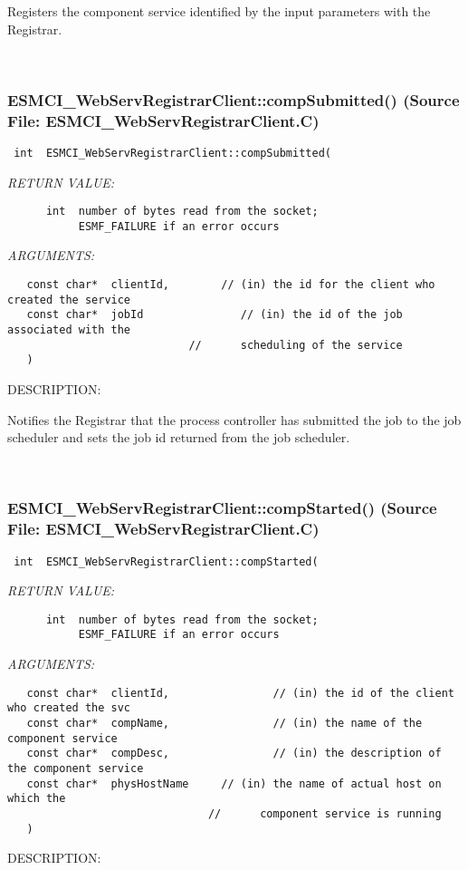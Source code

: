       Registers the component service identified by the input parameters
      with the Registrar.
   
 
\mbox{}\hrulefill\
 
\subsubsection{ESMCI\_WebServRegistrarClient::compSubmitted() (Source File: ESMCI\_WebServRegistrarClient.C)}


  
\begin{verbatim} int  ESMCI_WebServRegistrarClient::compSubmitted(\end{verbatim}{\em RETURN VALUE:}
\begin{verbatim}      int  number of bytes read from the socket;
           ESMF_FAILURE if an error occurs\end{verbatim}{\em ARGUMENTS:}
\begin{verbatim}   const char*  clientId,        // (in) the id for the client who created the service
   const char*  jobId               // (in) the id of the job associated with the
                            //      scheduling of the service
   )\end{verbatim}
{\sf DESCRIPTION:\\ }


      Notifies the Registrar that the process controller has submitted the
      job to the job scheduler and sets the job id returned from the job
      scheduler.
   
 
\mbox{}\hrulefill\
 
\subsubsection{ESMCI\_WebServRegistrarClient::compStarted() (Source File: ESMCI\_WebServRegistrarClient.C)}


  
\begin{verbatim} int  ESMCI_WebServRegistrarClient::compStarted(\end{verbatim}{\em RETURN VALUE:}
\begin{verbatim}      int  number of bytes read from the socket;
           ESMF_FAILURE if an error occurs\end{verbatim}{\em ARGUMENTS:}
\begin{verbatim}   const char*  clientId,                // (in) the id of the client who created the svc
   const char*  compName,                // (in) the name of the component service
   const char*  compDesc,                // (in) the description of the component service
   const char*  physHostName     // (in) the name of actual host on which the
                               //      component service is running
   )\end{verbatim}
{\sf DESCRIPTION:\\ }


